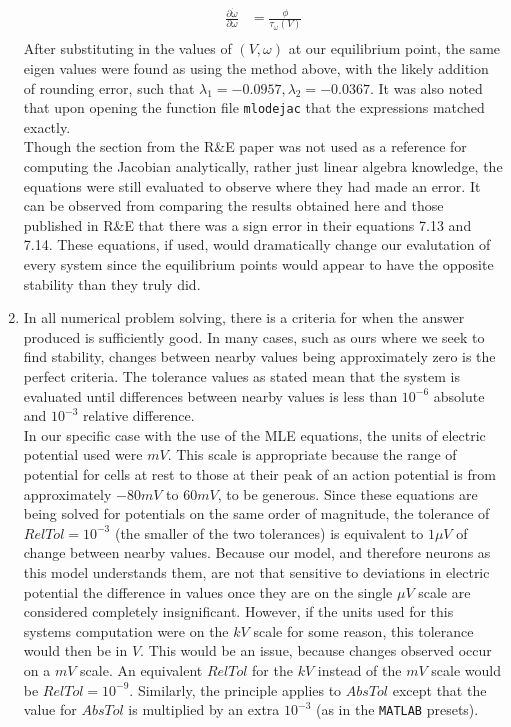 \documentclass[10pt]{report}
\newcommand{\matlab}[1]{\texttt{#1}}
\begin{document}
\begin{enumerate}
\begin{align*}
\frac{\partial \dot{\omega}}{\partial \omega} &= \frac{\phi}{\tau_{\omega}(V)} \\
\end{align*}
After substituting in the values of $(V, \omega)$ at our equilibrium point, the same eigen values were found as using the method above, with the likely addition of rounding error, such that $\lambda_1 = -0.0957, \lambda_2 = -0.0367$. It was also noted that upon opening the function file \matlab{mlodejac} that the expressions matched exactly.\\ Though the section from the R\&E paper was not used as a reference for computing the Jacobian analytically, rather just linear algebra knowledge, the equations were still evaluated to observe where they had made an error. It can be observed from comparing the results obtained here and those published in R\&E that there was a sign error in their equations 7.13 and 7.14. These equations, if used, would dramatically change our evalutation of every system since the equilibrium points would appear to have the opposite stability than they truly did.
%
%
\item In all numerical problem solving, there is a criteria for when the answer produced is sufficiently good. In many cases, such as ours where we seek to find stability, changes between nearby values being approximately zero is the perfect criteria. The tolerance values as stated mean that the system is evaluated until differences between nearby values is less than $10^{-6}$ absolute and $10^{-3}$ relative difference. \\ In our specific case with the use of the MLE equations, the units of electric potential used were $mV$. This scale is appropriate because the range of potential for cells at rest to those at their peak of an action potential is from approximately $-80mV$ to $60mV$, to be generous. Since these equations are being solved for potentials on the same order of magnitude, the tolerance of $RelTol=10^{-3}$ (the smaller of the two tolerances) is equivalent to $1 \mu  V$ of change between nearby values. Because our model, and therefore neurons as this model understands them, are not that sensitive to deviations in electric potential the difference in values once they are on the single $\mu V$ scale are considered completely insignificant. However, if the units used for this systems computation were on the $kV$ scale for some reason, this tolerance would then be in $V$. This would be an issue, because changes observed occur on a $mV$ scale. An equivalent $RelTol$ for the $kV$ instead of the $mV$ scale would be $RelTol=10^{-9}$. Similarly, the principle applies to $AbsTol$ except that the value for $AbsTol$ is multiplied by an extra $10^{-3}$ (as in the \matlab{MATLAB} presets).

\end{enumerate}
\end{document}
